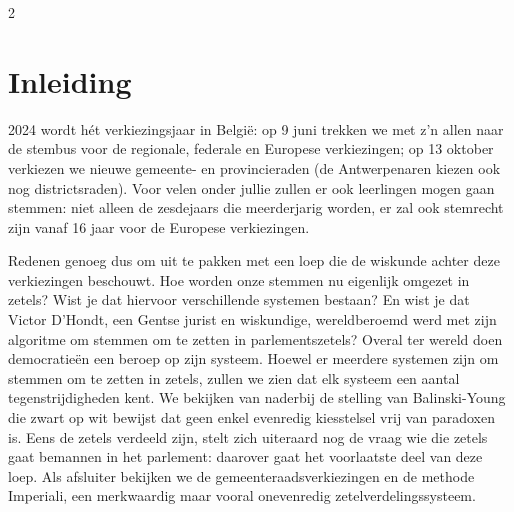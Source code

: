 

\startcontents[inhoudloep]	%

\begin{multicols}{2}
	
	\inhoudstafelloep			%
	

\section{Inleiding}
2024 wordt hét verkiezingsjaar in België: op 9 juni trekken we met z'n allen naar de stembus voor de regionale, federale en Europese verkiezingen; op 13 oktober verkiezen we nieuwe gemeente- en provincieraden (de Antwerpenaren kiezen ook nog districtsraden). Voor velen onder jullie zullen er ook leerlingen mogen gaan stemmen: niet alleen de zesdejaars die meerderjarig worden, er zal ook stemrecht zijn vanaf 16 jaar voor de Europese verkiezingen.

Redenen genoeg dus om uit te pakken met een loep die de wiskunde achter deze verkiezingen beschouwt. Hoe worden onze stemmen nu eigenlijk omgezet in zetels? Wist je dat hiervoor verschillende systemen bestaan? En wist je dat Victor D'Hondt, een Gentse jurist en wiskundige, wereldberoemd werd met zijn algoritme om stemmen om te zetten in parlementszetels? Overal ter wereld doen democratieën een beroep op zijn systeem. Hoewel er meerdere systemen zijn om stemmen om te zetten in zetels, zullen we zien dat elk systeem een aantal tegenstrijdigheden kent. We bekijken van naderbij de stelling van Balinski-Young die zwart op wit bewijst dat geen enkel evenredig kiesstelsel vrij van paradoxen is. Eens de zetels verdeeld zijn, stelt zich uiteraard nog de vraag wie die zetels gaat bemannen in het parlement: daarover gaat het voorlaatste deel van deze loep. Als afsluiter bekijken we de gemeenteraadsverkiezingen en de methode Imperiali, een merkwaardig maar vooral onevenredig zetelverdelingssysteem.


\end{multicols}
